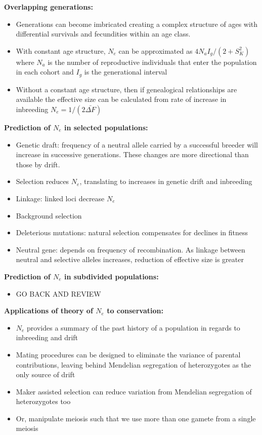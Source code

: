 \documentclass[12pt]{amsart}
\begin{document}
{\large \bf Overlapping generations:}
\begin{itemize}
\item Generations can become imbricated creating a complex structure of ages with differential survivals and fecundities within an age class. 
\item With constant age structure, $N_e$ can be approximated as $4N_aI_g / (2 + S_K^2)$ where $N_a$ is the number of reproductive individuals that enter the population in each cohort and $I_g$ is the generational interval
\item Without a constant age structure, then if genealogical relationships are available the effective size can be calculated from rate of increase in inbreeding $N_e = 1/(2\bar{\Delta F})$
\end{itemize}

{\large \bf Prediction of $N_e$ in selected populations:}
\begin{itemize}
\item Genetic draft: frequency of a neutral allele carried by a successful breeder will increase in successive generations. These changes are more directional than those by drift. 
\item Selection reduces $N_e$, translating to increases in genetic drift and inbreeding
\item Linkage: linked loci decrease $N_e$
\item Background selection
\item Deleterious mutations: natural selection compensates for declines in fitness
\item Neutral gene: depends on frequency of recombination. As linkage between neutral and selective alleles increases, reduction of effective size is greater 
\end{itemize}

{\large \bf Prediction of $N_e$ in subdivided populations:}
\begin{itemize}
\item GO BACK AND REVIEW 
\end{itemize}

{\large \bf Applications of theory of $N_e$ to conservation:}
\begin{itemize}
\item $N_e$ provides a summary of the past history of a population in regards to inbreeding and drift
\item Mating procedures can be designed to eliminate the variance of parental contributions, leaving behind Mendelian segregation of heterozygotes as the only source of drift
\item Maker assisted selection can reduce variation from Mendelian segregation of heterozygotes too
\item Or, manipulate meiosis such that we use more than one gamete from a single meiosis

\end{itemize}
\end{document}
